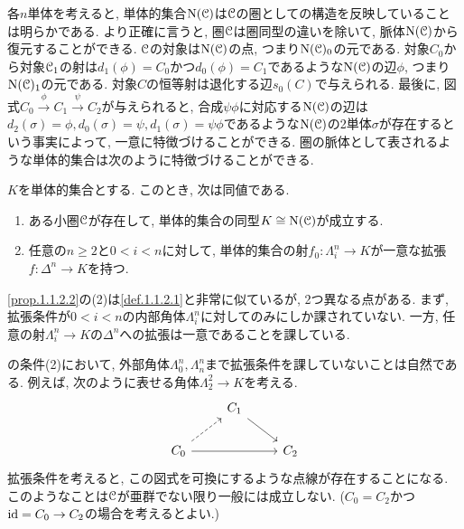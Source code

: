 \documentclass[uplatex, a4paper, 14Q, dvipdfmx]{jsreport}
\begin{document}
各$n$単体を考えると, 単体的集合$\mathrm{N}(\mathcal{C})$は$\mathcal{C}$の圏としての構造を反映していることは明らかである. 
より正確に言うと, 圏$\mathcal{C}$は圏同型の違いを除いて, 脈体$\mathrm{N}(\mathcal{C})$から復元することができる. 
$\mathcal{C}$の対象は$\mathrm{N}(\mathcal{C})$の点, つまり$\mathrm{N}(\mathcal{C})_0$の元である. 
対象$C_0$から対象$\mathcal{C}_1$の射は$d_1(\phi)=C_0$かつ$d_0(\phi)=C_1$であるような$\mathrm{N}(\mathcal{C})$の辺$\phi$, つまり$\mathrm{N}(\mathcal{C})_1$の元である. 
対象$C$の恒等射は退化する辺$s_0(C)$で与えられる.
最後に, 図式$C_0 \xrightarrow{\phi} C_1 \xrightarrow{\psi} C_2$が与えられると, 合成$\psi\phi$に対応する$\mathrm{N}(\mathcal{C})$の辺は$d_2(\sigma)=\phi,d_0(\sigma)=\psi,d_1(\sigma)=\psi\phi$であるような$\mathrm{N}(\mathcal{C})$の2単体$\sigma$が存在するという事実によって, 一意に特徴づけることができる.
圏の脈体として表されるような単体的集合は次のように特徴づけることができる. 

\begin{proposition} \label{prop.1.1.2.2}
  $K$を単体的集合とする. 
  このとき, 次は同値である. 
  \begin{enumerate}
    \item ある小圏$\mathcal{C}$が存在して, 単体的集合の同型$K \cong \mathrm{N}(\mathcal{C})$が成立する. 
    \item 任意の$n \geq 2$と$0<i<n$に対して, 単体的集合の射$f_0 : \Lambda^n_i \to K$が一意な拡張$f : \Delta^n \to K$を持つ.
  \end{enumerate}
\end{proposition}

\cref{prop.1.1.2.2}の(2)は\cref{def.1.1.2.1}と非常に似ているが, 2つ異なる点がある.
まず, 拡張条件が$0<i<n$の内部角体$\Lambda^n_i$に対してのみにしか課されていない. 
一方, 任意の射$\Lambda^n_i \to K$の$\Delta^n$への拡張は一意であることを課している. 

\begin{remark} \label{rem.1.1.2.3}
  の条件(2)において, 外部角体$\Lambda^n_0,\Lambda^n_n$まで拡張条件を課していないことは自然である.
  例えば, 次のように表せる角体$\Lambda^2_2 \to K$を考える. 
  \[\begin{tikzcd}
    & {C_1} \\
    {C_0} && {C_2}
    \arrow[from=1-2, to=2-3]
    \arrow[dashed, from=2-1, to=1-2]
    \arrow[from=2-1, to=2-3]
  \end{tikzcd}\]
  拡張条件を考えると, この図式を可換にするような点線が存在することになる.
  このようなことは$\mathcal{C}$が亜群でない限り一般には成立しない. ($C_0=C_2$かつ$\mathrm{id} = C_0 \to C_2$の場合を考えるとよい.)
\end{remark}
\end{document}
